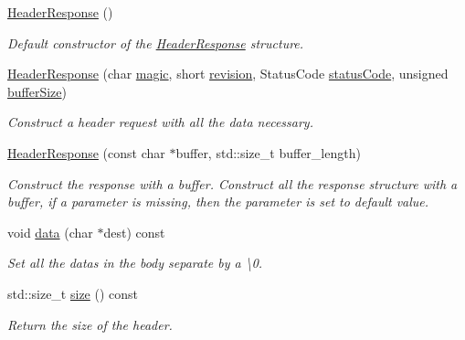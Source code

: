 \begin{DoxyCompactItemize}
\item 
\mbox{\label{structprotocol_1_1serialize_1_1_header_response_a20d7aecf27bce16d434c1235a629b15d}} 
\hyperlink{structprotocol_1_1serialize_1_1_header_response_a20d7aecf27bce16d434c1235a629b15d}{Header\+Response} ()
\begin{DoxyCompactList}\small\item\em Default constructor of the \hyperlink{structprotocol_1_1serialize_1_1_header_response}{Header\+Response} structure. \end{DoxyCompactList}\item 
\hyperlink{structprotocol_1_1serialize_1_1_header_response_a8216e5e37cc68ff29d47d6c1750a4ff3}{Header\+Response} (char \hyperlink{structprotocol_1_1serialize_1_1_header_response_adcf0f736dcd6535a49c4373cccb146a1}{magic}, short \hyperlink{structprotocol_1_1serialize_1_1_header_response_a9dcd816424a4a3c3504c9fbf242c4eaa}{revision}, Status\+Code \hyperlink{structprotocol_1_1serialize_1_1_header_response_aee1d562d973f3d653927252e1fe4135d}{status\+Code}, unsigned \hyperlink{structprotocol_1_1serialize_1_1_header_response_a30b58c44566a0125f58e6e7ca4ebaf11}{buffer\+Size})
\begin{DoxyCompactList}\small\item\em Construct a header request with all the data necessary. \end{DoxyCompactList}\item 
\hyperlink{structprotocol_1_1serialize_1_1_header_response_a4255562b93679fb7903cf08655edeb25}{Header\+Response} (const char $\ast$buffer, std\+::size\+\_\+t buffer\+\_\+length)
\begin{DoxyCompactList}\small\item\em Construct the response with a buffer. Construct all the response structure with a buffer, if a parameter is missing, then the parameter is set to default value. \end{DoxyCompactList}\item 
void \hyperlink{structprotocol_1_1serialize_1_1_header_response_a3aef8701cedf62dfc47a8fa152c0973d}{data} (char $\ast$dest) const
\begin{DoxyCompactList}\small\item\em Set all the datas in the body separate by a \textbackslash{}0. \end{DoxyCompactList}\item 
\mbox{\label{structprotocol_1_1serialize_1_1_header_response_ace0d9f44cc55c1c70ba83bf222cdc4db}} 
std\+::size\+\_\+t \hyperlink{structprotocol_1_1serialize_1_1_header_response_ace0d9f44cc55c1c70ba83bf222cdc4db}{size} () const
\begin{DoxyCompactList}\small\item\em Return the size of the header. \end{DoxyCompactList}\end{DoxyCompactItemize}
